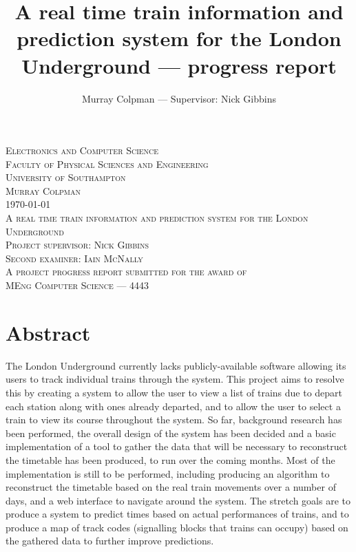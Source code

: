 \documentclass[a4paper,12pt]{article}
\title{A real time train information and prediction system for the London Underground --- progress report}
\author{Murray Colpman --- Supervisor: Nick Gibbins}
\begin{document}
\begin{titlepage}
  \begin{center}
    \textsc{\Large Electronics and Computer Science}\\
    \textsc{\Large Faculty of Physical Sciences and Engineering}\\
    \textsc{\Large University of Southampton}\\[1.5cm]
    \textsc{\Large Murray Colpman}\\
    \textsc{\Large \today}\\[1.5cm]
    \textsc{\LARGE A real time train information and prediction system for the London Underground}\\[1.5cm]
    \textsc{\large Project supervisor: Nick Gibbins}\\
    \textsc{\large Second examiner: Iain McNally}\\[1.5cm]
    \textsc{\large A project progress report submitted for the award of}\\
    \textsc{\large MEng Computer Science --- 4443}
  \end{center}
\end{titlepage}

\section*{Abstract}

The London Underground currently lacks publicly-available software allowing its
users to track individual trains through the system. This project aims to
resolve this by creating a system to allow the user to view a list of trains
due to depart each station along with ones already departed, and to allow the
user to select a train to view its course throughout the system. So far,
background research has been performed, the overall design of the system has
been decided and a basic implementation of a tool to gather the data that will
be necessary to reconstruct the timetable has been produced, to run over the
coming months. Most of the implementation is still to be performed, including
producing an algorithm to reconstruct the timetable based on the real train
movements over a number of days, and a web interface to navigate around the
system. The stretch goals are to produce a system to predict times based on
actual performances of trains, and to produce a map of track codes (signalling
blocks that trains can occupy) based on the gathered data to further improve
predictions.

\pagebreak
\end{document}
